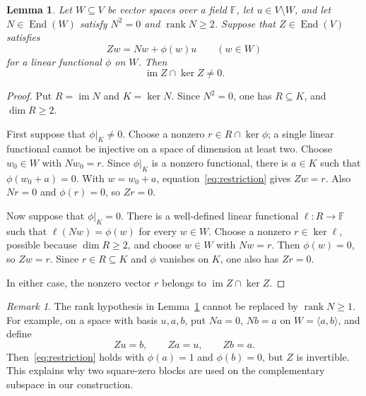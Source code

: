 \documentclass[11pt]{article}
\newtheorem{lemma}[theorem]{Lemma}
\theoremstyle{remark}\newtheorem{remark}[theorem]{Remark}
\newcommand{\F}{\mathbb F}
\newcommand{\im}{\operatorname{im}}
\newcommand{\rk}{\operatorname{rank}}
\newcommand{\End}{\operatorname{End}}
\begin{document}
\begin{lemma}\label{lem:chain}
Let $W\subseteq V$ be vector spaces over a field $\F$, let $u\in V\setminus W$, and let $N\in\End(W)$ satisfy $N^2=0$ and $\rk N\ge2$. Suppose that $Z\in\End(V)$ satisfies
\begin{equation}\label{eq:restriction}
 Zw=Nw+\phi(w)u\qquad(w\in W)
\end{equation}
for a linear functional $\phi$ on $W$. Then
\[
 \im Z\cap\ker Z\ne0.
\]
\end{lemma}
\begin{proof}
Put $R=\im N$ and $K=\ker N$. Since $N^2=0$, one has $R\subseteq K$, and $\dim R\ge2$.

First suppose that $\phi|_K\ne0$. Choose a nonzero $r\in R\cap\ker\phi$; a single linear functional cannot be injective on a space of dimension at least two. Choose $w_0\in W$ with $Nw_0=r$. Since $\phi|_K$ is a nonzero functional, there is $a\in K$ such that $\phi(w_0+a)=0$. With $w=w_0+a$, equation~\eqref{eq:restriction} gives $Zw=r$. Also $Nr=0$ and $\phi(r)=0$, so $Zr=0$.

Now suppose that $\phi|_K=0$. There is a well-defined linear functional $\ell:R\to\F$ such that $\ell(Nw)=\phi(w)$ for every $w\in W$. Choose a nonzero $r\in\ker\ell$, possible because $\dim R\ge2$, and choose $w\in W$ with $Nw=r$. Then $\phi(w)=0$, so $Zw=r$. Since $r\in R\subseteq K$ and $\phi$ vanishes on $K$, one also has $Zr=0$.

In either case, the nonzero vector $r$ belongs to $\im Z\cap\ker Z$.
\end{proof}

\begin{remark}
The rank hypothesis in Lemma~\ref{lem:chain} cannot be replaced by $\rk N\ge1$. For example, on a space with basis $u,a,b$, put $Na=0$, $Nb=a$ on $W=\langle a,b\rangle$, and define
\[
 Zu=b,\qquad Za=u,\qquad Zb=a.
\]
Then~\eqref{eq:restriction} holds with $\phi(a)=1$ and $\phi(b)=0$, but $Z$ is invertible. This explains why two square-zero blocks are used on the complementary subspace in our construction.
\end{remark}
\end{document}
